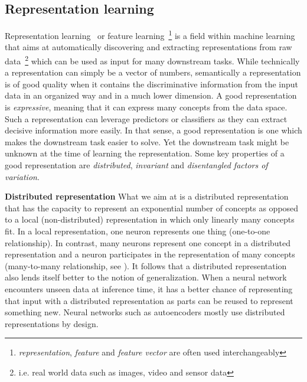 \documentclass[12pt,a4paper]{article}
\begin{document}

\subsection{Representation learning}
Representation learning~\cite{ReprLearning} or feature learning~\footnote{\textit{representation}, \textit{feature} and \textit{feature vector} are often used interchangeably} is a field within machine learning that aims at automatically discovering and extracting representations from raw data~\footnote{i.e. real world data such as images, video and sensor data} which can be used as input for many downstream tasks. While technically a representation can simply be a vector of numbers, semantically a representation is of good quality when it contains the discriminative information from the input data in an organized way and in a much lower dimension. A good representation is \textit{expressive}, meaning that it can express many concepts from the data space. Such a representation can leverage predictors or classifiers as they can extract decisive information more easily. In that sense, a good representation is one which makes the downstream task easier to solve. Yet the downstream task might be unknown at the time of learning the representation. Some key properties of a good representation are \textit{distributed}, \textit{invariant} and \textit{disentangled factors of variation}.

\textbf{Distributed representation}
What we aim at is a distributed representation that has the capacity to represent an exponential number of concepts as opposed to a local (non-distributed) representation in which only linearly many concepts fit. In a local representation, one neuron represents one thing (one-to-one relationship). In contrast, many neurons represent one concept in a distributed representation and a neuron participates in the representation of many concepts (many-to-many relationship, see \cite{DistrRepHinton}). It follows that a distributed representation also lends itself better to the notion of generalization. When a neural network encounters unseen data at inference time, it has a better chance of representing that input with a distributed representation as parts can be reused to represent something new. Neural networks such as autoencoders mostly use distributed representations by design.
\end{document}
